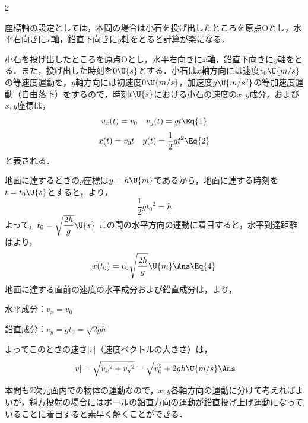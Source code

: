 \begin{multicols}{2}
\begin{sisin}
座標軸の設定としては，本問の場合は小石を投げ出したところを原点$\mathrm{O}$とし，水平右向きに$x$軸，鉛直下向きに$y$軸をとると計算が楽になる．
\end{sisin}
\par\nopagebreak
\hspace{1zw}小石を投げ出したところを原点$\mathrm{O}$とし，水平右向きに$x$軸，鉛直下向きに$y$軸をとる．また，投げ出した時刻を$0\U{s}$とする．小石は$x$軸方向には速度$v_0\U{m/s}$の等速度運動を，$y$軸方向には初速度$0\U{m/s}$，加速度$g\U{m/s^2}$の等加速度運動（自由落下）をするので，時刻$t\U{s}$における小石の速度の$x,y$成分，および$x,y$座標は，
\[v_x(t)=v_0\quad v_y(t)=gt\Eq{1}\]
\[x(t)=v_0t\quad y(t)=\frac{1}{2}gt^2\Eq{2}\]
と表される．
\begin{komon}
 地面に達するときの$y$座標は$y=h\U{m}$であるから，地面に達する時刻を$t=t_0\U{s}$とすると，より，
       \[\frac{1}{2}g{t_0}^2=h\]
       よって，$t_0=\sqrt{\dfrac{2h}{g}}\U{s}$\Ans{}
 この間の水平方向の運動に着目すると，水平到達距離はより，
       \[x(t_0)=v_0\sqrt{\frac{2h}{g}}\U{m}\Ans\Eq{4}\]
 地面に達する直前の速度の水平成分および鉛直成分は，より，\par
       \hspace{1zw}水平成分：$v_x=v_0$\par
       \hspace{1zw}鉛直成分：$v_y=gt_0=\sqrt{2gh}$\par
       \hspace{1zw}よってこのときの速さ$|v|$（速度ベクトルの大きさ）は，
       \[|v|=\sqrt{{v_x}^2+{v_y}^2}=\sqrt{v_0^2+2gh}\U{m/s}\Ans\]
\end{komon}

\par\nopagebreak
\begin{sisin}
本問も2次元面内での物体の運動なので，$x,y$各軸方向の運動に分けて考えればよいが，斜方投射の場合にはボールの鉛直方向の運動が鉛直投げ上げ運動になっていることに着目すると素早く解くことができる．


\end{sisin}
\end{multicols}
